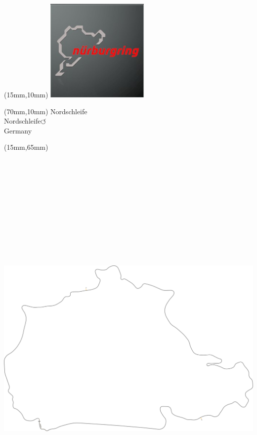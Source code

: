 \null\newpage
\begin{textblock*}{50mm}(15mm,10mm)%
\includegraphics[width=50mm]{LG/2015-05-20_00088.png}
\end{textblock*}
\begin{textblock*}{130mm}(70mm,10mm)%
{\fontsize{20}{20}\selectfont Nordschleife\\}
{\fontsize{16}{16}\selectfont Nordschleife\hfill \huge$\circlearrowleft$\\}
{\fontsize{12}{12}\selectfont Germany\\}
\end{textblock*}
\begin{textblock*}{185mm}(15mm,65mm)%
\centering
\mbox{\includegraphics[width=185mm,height=210mm,keepaspectratio]{PT/NO.pdf}}
\end{textblock*}
